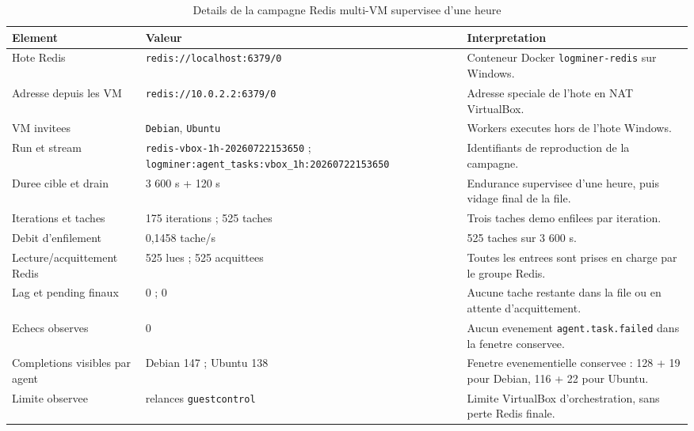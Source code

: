 \begin{table}[H]
\centering
\caption{Details de la campagne Redis multi-VM supervisee d'une heure}
\label{tab:vbox-redis-1h-details}
\scriptsize
\begin{tabularx}{\textwidth}{p{4.2cm}p{3.5cm}X}
\toprule
\textbf{Element} & \textbf{Valeur} & \textbf{Interpretation} \\
\midrule
Hote Redis & \texttt{redis://localhost:6379/0} & Conteneur Docker \texttt{logminer-redis} sur Windows. \\
Adresse depuis les VM & \texttt{redis://10.0.2.2:6379/0} & Adresse speciale de l'hote en NAT VirtualBox. \\
VM invitees & \texttt{Debian}, \texttt{Ubuntu} & Workers executes hors de l'hote Windows. \\
Run et stream & \texttt{redis-vbox-1h-20260722153650} ; \texttt{logminer:agent\_tasks:vbox\_1h:20260722153650} & Identifiants de reproduction de la campagne. \\
Duree cible et drain & 3 600 s + 120 s & Endurance supervisee d'une heure, puis vidage final de la file. \\
Iterations et taches & 175 iterations ; 525 taches & Trois taches demo enfilees par iteration. \\
Debit d'enfilement & 0,1458 tache/s & 525 taches sur 3 600 s. \\
Lecture/acquittement Redis & 525 lues ; 525 acquittees & Toutes les entrees sont prises en charge par le groupe Redis. \\
Lag et pending finaux & 0 ; 0 & Aucune tache restante dans la file ou en attente d'acquittement. \\
Echecs observes & 0 & Aucun evenement \texttt{agent.task.failed} dans la fenetre conservee. \\
Completions visibles par agent & Debian 147 ; Ubuntu 138 & Fenetre evenementielle conservee : 128 + 19 pour Debian, 116 + 22 pour Ubuntu. \\
Limite observee & relances \texttt{guestcontrol} & Limite VirtualBox d'orchestration, sans perte Redis finale. \\
\bottomrule
\end{tabularx}
\end{table}


